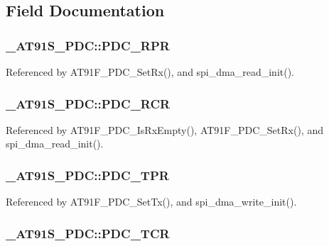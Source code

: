 \subsection{Field Documentation}
\hypertarget{struct__AT91S__PDC_96c8c767475f69faf5c83cbac1690102}{
\subsubsection{ {\bf \_\-AT91S\_\-PDC::PDC\_\-RPR}}}
\label{struct__AT91S__PDC_96c8c767475f69faf5c83cbac1690102}




Referenced by AT91F\_\-PDC\_\-SetRx(), and spi\_\-dma\_\-read\_\-init().\hypertarget{struct__AT91S__PDC_d1688f602dd1c369fc1604c51cc05c2f}{
\subsubsection{ {\bf \_\-AT91S\_\-PDC::PDC\_\-RCR}}}
\label{struct__AT91S__PDC_d1688f602dd1c369fc1604c51cc05c2f}




Referenced by AT91F\_\-PDC\_\-IsRxEmpty(), AT91F\_\-PDC\_\-SetRx(), and spi\_\-dma\_\-read\_\-init().\hypertarget{struct__AT91S__PDC_15d473588119af649205c986be0e6639}{
\subsubsection{ {\bf \_\-AT91S\_\-PDC::PDC\_\-TPR}}}
\label{struct__AT91S__PDC_15d473588119af649205c986be0e6639}




Referenced by AT91F\_\-PDC\_\-SetTx(), and spi\_\-dma\_\-write\_\-init().\hypertarget{struct__AT91S__PDC_9e2a379cc2a8a64b215de556a0ba8b2e}{
\subsubsection{ {\bf \_\-AT91S\_\-PDC::PDC\_\-TCR}}}
\label{struct__AT91S__PDC_9e2a379cc2a8a64b215de556a0ba8b2e}




